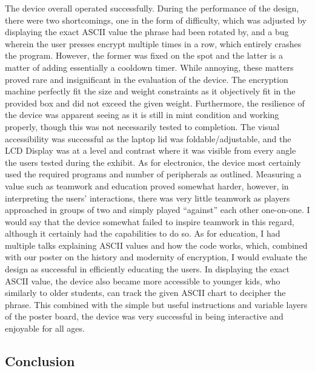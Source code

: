 \documentclass[conference]{IEEEtran}
\begin{document}
\par The device overall operated successfully. During the performance of the design, there were two shortcomings, one in the form of difficulty, which was adjusted by displaying the exact ASCII value the phrase had been rotated by, and a bug wherein the user presses encrypt multiple times in a row, which entirely crashes the program. However, the former was fixed on the spot and the latter is a matter of adding essentially a cooldown timer. While annoying, these matters proved rare and insignificant in the evaluation of the device. The encryption machine perfectly fit the size and weight constraints as it objectively fit in the provided box and did not exceed the given weight. Furthermore, the resilience of the device was apparent seeing as it is still in mint condition and working properly, though this was not necessarily tested to completion. The visual accessibility was successful as the laptop lid was foldable/adjustable, and the LCD Display was at a level and contrast where it was visible from every angle the users tested during the exhibit. As for electronics, the device most certainly used the required programs and number of peripherals as outlined. Measuring a value such as teamwork and education proved somewhat harder, however, in interpreting the users’ interactions, there was very little teamwork as players approached in groups of two and simply played “against” each other one-on-one. I would say that the device somewhat failed to inspire teamwork in this regard, although it certainly had the capabilities to do so. As for education, I had multiple talks explaining ASCII values and how the code works, which, combined with our poster on the history and modernity of encryption, I would evaluate the design as successful in efficiently educating the users. In displaying the exact ASCII value, the device also became more accessible to younger kids, who similarly to older students, can track the given ASCII chart to decipher the phrase. This combined with the simple but useful instructions and variable layers of the poster board, the device was very successful in being interactive and enjoyable for all ages. 

\subsection{Conclusion}
\end{document}
